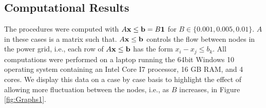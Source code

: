 \subsection{Computational Results} \label{ssec:compres}


The procedures were computed with $A \mathbf{x} \leq \mathbf{b} = B \mathbf{1}$ for $B \in\{0.001, 0.005,0.01\}$.
$A$ in these cases is a matrix such that. $A \mathbf{x} \leq \mathbf{b}$ controls the flow between nodes in the power grid, i.e., each row of $A\mathbf{x} \leq \mathbf{b}$ has the form $x_i-x_j\leq b_k$. 
All computations were performed on a laptop running the 64bit Windows 10 operating system containing an Intel Core I7 processor, 16 GB RAM, and 4 cores. 
We display this data on a case by case basis to highlight the effect of allowing more fluctuation between the nodes, i.e., as $B$ increases, in Figure \ref{fig:Graphs1}.
\medskip

